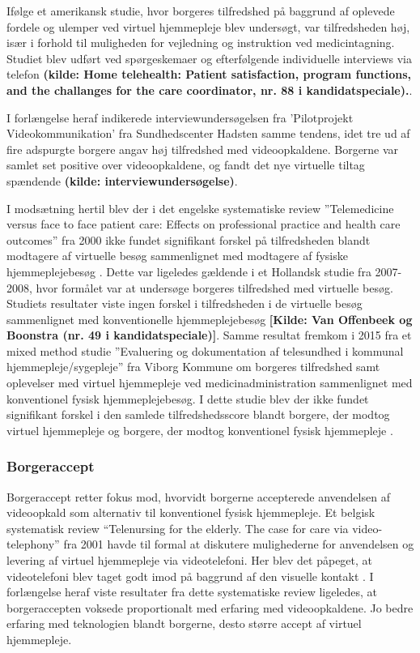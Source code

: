 Ifølge et amerikansk studie, hvor borgeres tilfredshed på baggrund af oplevede fordele og ulemper ved virtuel hjemmepleje blev undersøgt, var tilfredsheden høj, især i forhold til muligheden for vejledning og instruktion ved medicintagning. Studiet blev udført ved spørgeskemaer og efterfølgende individuelle interviews via telefon \textbf{(kilde: Home telehealth: Patient satisfaction, program functions, and the challanges for the care coordinator, nr. 88 i kandidatspeciale).}.

I forlængelse heraf indikerede interviewundersøgelsen fra ’Pilotprojekt Videokommunikation’ fra Sundhedscenter Hadsten samme tendens, idet tre ud af fire adspurgte borgere angav høj tilfredshed med videoopkaldene. Borgerne var samlet set positive over videoopkaldene, og fandt det nye virtuelle tiltag spændende \textbf{(kilde: interviewundersøgelse)}.

I modsætning hertil blev der i det engelske systematiske review ”Telemedicine versus face to face patient care: Effects on professional practice and health care outcomes” fra 2000 ikke fundet signifikant forskel på tilfredsheden blandt modtagere af virtuelle besøg sammenlignet med modtagere af fysiske hjemmeplejebesøg \cite{Paf2}. Dette var ligeledes gældende i et Hollandsk studie fra 2007-2008, hvor formålet var at undersøge borgeres tilfredshed med virtuelle besøg. Studiets resultater viste ingen forskel i tilfredsheden i de virtuelle besøg sammenlignet med konventionelle hjemmeplejebesøg \textbf{[Kilde: Van Offenbeek og Boonstra (nr. 49 i kandidatspeciale)]}. Samme resultat fremkom i 2015 fra et mixed method studie ”Evaluering og dokumentation af telesundhed i kommunal hjemmepleje/sygepleje” fra Viborg Kommune om borgeres tilfredshed samt oplevelser med virtuel hjemmepleje ved medicinadministration sammenlignet med konventionel fysisk hjemmeplejebesøg. I dette studie blev der ikke fundet signifikant forskel i den samlede tilfredshedsscore blandt borgere, der modtog virtuel hjemmepleje og borgere, der modtog konventionel fysisk hjemmepleje \cite{kandidat}.

\subsubsection{Borgeraccept}
Borgeraccept retter fokus mod, hvorvidt borgerne accepterede anvendelsen af videoopkald som alternativ til konventionel fysisk hjemmepleje. Et belgisk systematisk review “Telenursing for the elderly. The case for care via video-telephony” fra 2001 havde til formal at diskutere mulighederne for anvendelsen og levering af virtuel hjemmepleje via videotelefoni. Her blev det påpeget, at videotelefoni blev taget godt imod på baggrund af den visuelle kontakt \cite{telenursing}. I forlængelse heraf viste resultater fra dette systematiske review ligeledes, at borgeraccepten voksede proportionalt med erfaring med videoopkaldene. Jo bedre erfaring med teknologien blandt borgerne, desto større accept af virtuel hjemmepleje.

